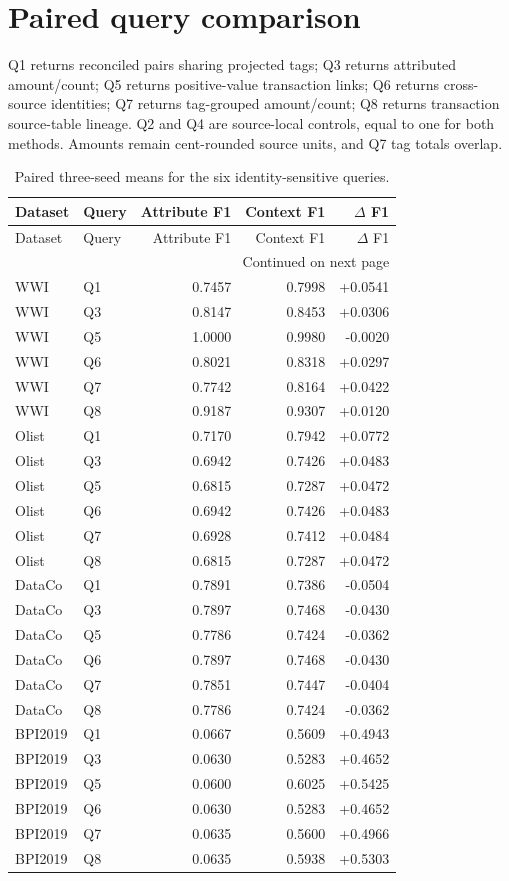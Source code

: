 \documentclass[11pt,letterpaper]{article}
\begin{document}
\section{Paired query comparison}
Q1 returns reconciled pairs sharing projected tags; Q3 returns attributed amount/count; Q5 returns positive-value transaction links; Q6 returns cross-source identities; Q7 returns tag-grouped amount/count; Q8 returns transaction source-table lineage. Q2 and Q4 are source-local controls, equal to one for both methods. Amounts remain cent-rounded source units, and Q7 tag totals overlap.


\small\begin{longtable}{llrrr}
\caption{Paired three-seed means for the six identity-sensitive queries.}\\
\toprule Dataset & Query & Attribute F1 & Context F1 & $\Delta$ F1\\\midrule\endfirsthead
\toprule Dataset & Query & Attribute F1 & Context F1 & $\Delta$ F1\\\midrule\endhead
\midrule\multicolumn{5}{r}{Continued on next page}\\\endfoot
\bottomrule\endlastfoot
WWI & Q1 & 0.7457 & 0.7998 & +0.0541\\
WWI & Q3 & 0.8147 & 0.8453 & +0.0306\\
WWI & Q5 & 1.0000 & 0.9980 & -0.0020\\
WWI & Q6 & 0.8021 & 0.8318 & +0.0297\\
WWI & Q7 & 0.7742 & 0.8164 & +0.0422\\
WWI & Q8 & 0.9187 & 0.9307 & +0.0120\\
Olist & Q1 & 0.7170 & 0.7942 & +0.0772\\
Olist & Q3 & 0.6942 & 0.7426 & +0.0483\\
Olist & Q5 & 0.6815 & 0.7287 & +0.0472\\
Olist & Q6 & 0.6942 & 0.7426 & +0.0483\\
Olist & Q7 & 0.6928 & 0.7412 & +0.0484\\
Olist & Q8 & 0.6815 & 0.7287 & +0.0472\\
DataCo & Q1 & 0.7891 & 0.7386 & -0.0504\\
DataCo & Q3 & 0.7897 & 0.7468 & -0.0430\\
DataCo & Q5 & 0.7786 & 0.7424 & -0.0362\\
DataCo & Q6 & 0.7897 & 0.7468 & -0.0430\\
DataCo & Q7 & 0.7851 & 0.7447 & -0.0404\\
DataCo & Q8 & 0.7786 & 0.7424 & -0.0362\\
BPI2019 & Q1 & 0.0667 & 0.5609 & +0.4943\\
BPI2019 & Q3 & 0.0630 & 0.5283 & +0.4652\\
BPI2019 & Q5 & 0.0600 & 0.6025 & +0.5425\\
BPI2019 & Q6 & 0.0630 & 0.5283 & +0.4652\\
BPI2019 & Q7 & 0.0635 & 0.5600 & +0.4966\\
BPI2019 & Q8 & 0.0635 & 0.5938 & +0.5303\\
\end{longtable}\normalsize
\end{document}
